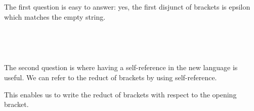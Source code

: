 The first question is easy to answer: yes, the first disjunct of brackets is epsilon which matches the empty string.
%
\begin{code}[hide]%
%
\>[4]\AgdaSpace{}%
\AgdaSymbol{=}\AgdaSpace{}%
\AgdaSpace{}%
\AgdaSpace{}%
\AgdaSpace{}%
\AgdaString{'['}\AgdaSpace{}%
\AgdaSpace{}%
\AgdaSpace{}%
\AgdaSpace{}%
\AgdaSpace{}%
\AgdaString{']'}\AgdaSpace{}%
\AgdaSpace{}%
\AgdaSpace{}%
\AgdaSpace{}%
\<%
\\
%
\>[4]\AgdaSpace{}%
\AgdaSymbol{=}\AgdaSpace{}%
\AgdaSpace{}%
\AgdaSpace{}%
\<%
\end{code}
\begin{code}%
%
\>[4]\AgdaSpace{}%
\AgdaSymbol{:}\AgdaSpace{}%
\AgdaSpace{}%
\AgdaSymbol{(}\AgdaSpace{}%
\AgdaSymbol{)}\<%
\\
%
\>[4]\AgdaSpace{}%
\AgdaSymbol{=}\AgdaSpace{}%
\AgdaSpace{}%
\AgdaSymbol{(}\AgdaSpace{}%
\AgdaSymbol{(}\AgdaSpace{}%
\AgdaSymbol{))}\<%
\end{code}

The second question is where having a self-reference in the new language is useful. We can refer to the reduct of brackets by using self-reference.

This enables us to write the reduct of brackets with respect to the opening bracket.

\begin{code}%
%
\>[4]%
\>[16]\AgdaSymbol{=}\AgdaSpace{}%
\AgdaSpace{}%
\AgdaSpace{}%
\AgdaSpace{}%
\AgdaSpace{}%
\AgdaString{']'}\AgdaSpace{}%
\AgdaSpace{}%
\AgdaSpace{}%
\AgdaSpace{}%
\AgdaSpace{}%
\AgdaSpace{}%
\AgdaSpace{}%
\AgdaSpace{}%
\AgdaSpace{}%
\<%
\\
%
\>[4]%
\>[16]\AgdaSymbol{=}\AgdaSpace{}%
\AgdaSpace{}%
\AgdaSpace{}%
\<%
\end{code}

